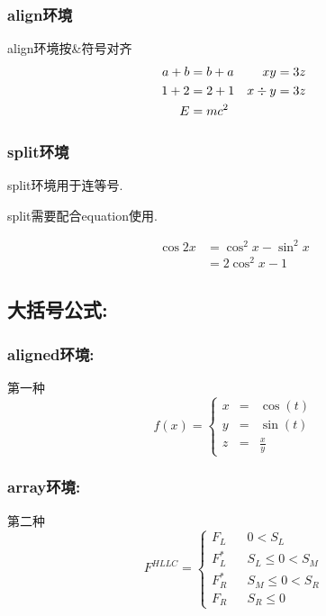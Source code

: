 \documentclass[12pt]{ctexart}
\begin{document}
\subsubsection{align环境}
align环境按\&符号对齐
\begin{align}
	a+b &= b+a & xy       &= 3z\\
	1+2 &= 2+1 & x \div y &= 3z\notag \\
	E   &= mc^2
\end{align}

\subsubsection{split环境}
split环境用于连等号.\par
split需要配合equation使用.\par
\begin{equation}
	\begin{split}
		\cos 2x &= \cos^2 x - \sin^2 x	\\
		&= 2\cos^2 x - 1
	\end{split}
\end{equation}


\subsection{大括号公式:}
\subsubsection{aligned环境:}
\par 第一种
$$	
f(x)=\left\{
\begin{aligned}
	x & = & \cos(t) \\
	y & = & \sin(t) \\
	z & = & \frac xy
\end{aligned}
\right.
$$
\subsubsection{array环境:}
\par 第二种
$$ F^{HLLC}=\left\{
\begin{array}{rcl}
	F_L       &      & {0      <      S_L}\\
	F^*_L     &      & {S_L \leq 0 < S_M}\\
	F^*_R     &      & {S_M \leq 0 < S_R}\\
	F_R       &      & {S_R \leq 0}
\end{array} \right. $$
\end{document}
